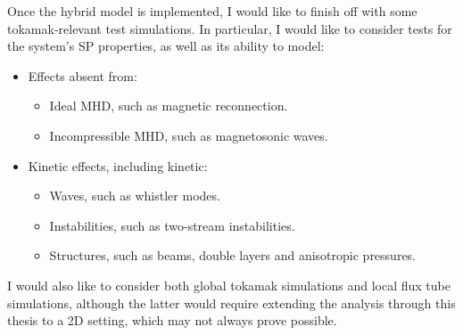     \begin{remark}
        Once the hybrid model is implemented, I would like to finish off with some tokamak-relevant test simulations. In particular, I would like to consider tests for the system's SP properties, as well as its ability to model:
        \begin{itemize}
          \item  Effects absent from:
          \begin{itemize}
              \item  Ideal MHD, such as magnetic reconnection. \cite{Dungey_1961, Lockwood_2016}
              \item  Incompressible MHD, such as magnetosonic waves.
          \end{itemize}
            \item  Kinetic effects, including kinetic:
            \begin{itemize}
                \item  Waves, such as whistler modes. \cite{Chen_2015}
                \item  Instabilities, such as two-stream instabilities. \cite{ONeil_Malmberg_1968, Stix_1992}
                \item  Structures, such as beams, double layers and anisotropic pressures.
            \end{itemize}
        \end{itemize}
        I would also like to consider both global tokamak simulations and local flux tube simulations, although the latter would require extending the analysis through this thesis to a 2D setting, which may not always prove possible.
    \end{remark}
    